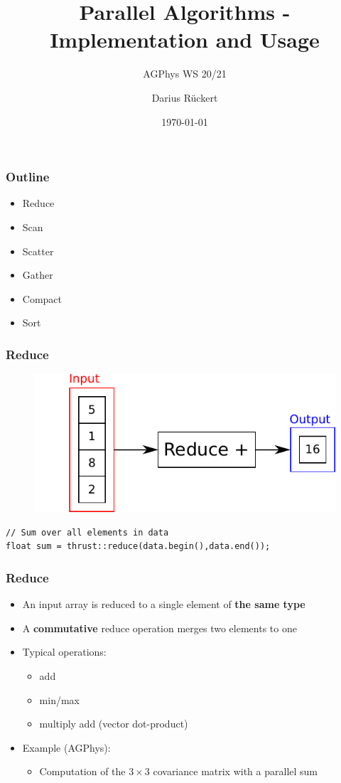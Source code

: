 \documentclass[aspectratio=169,handout]{beamer}
\subtitle{AGPhys WS 20/21}
\title{Parallel Algorithms - Implementation and Usage}
\author[Darius Rückert]{Darius Rückert}
\date{\today}
\begin{document}
\frame
{
	\titlepage
}

\frame
{
\frametitle{Outline}
\begin{itemize}
	\item Reduce 
	\item Scan 
	\item Scatter
	\item Gather
	\item Compact
	\item Sort
\end{itemize}
}



\begin{frame}[fragile]
\frametitle{Reduce}
\begin{figure}
	\centering
	\includegraphics[height=0.6\textheight]{o_reduce}
\end{figure}

\begin{lstlisting}
// Sum over all elements in data
float sum = thrust::reduce(data.begin(),data.end());
\end{lstlisting}
\end{frame}

\frame
{	
	\frametitle{Reduce}
	\begin{itemize}
		\item An input array is reduced to a single element of \textbf{the same type}
		\item<2-> A \textbf{commutative} reduce operation merges two elements to one
		\item<2-> Typical operations:
		\begin{itemize}
			\item add
			\item min/max
			\item multiply add (vector dot-product)
		\end{itemize}
		\item<3-> Example (AGPhys):
		\begin{itemize}
			\item Computation of the $3 \times 3$ covariance matrix with a parallel sum
		\end{itemize}
	\end{itemize}
}
\end{document}
